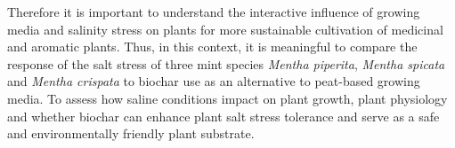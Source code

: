 Therefore it is important to understand the interactive influence of growing media and salinity stress on plants for more sustainable cultivation of medicinal and aromatic plants. Thus, in this context, it is meaningful to compare the response of the salt stress of three mint species \textit{Mentha piperita}, \textit{Mentha spicata} and \textit{Mentha crispata} to biochar use as an alternative to peat-based growing media. To assess how saline conditions impact on plant growth, plant physiology and whether biochar can enhance plant salt stress tolerance and serve as a safe and environmentally friendly plant substrate.
